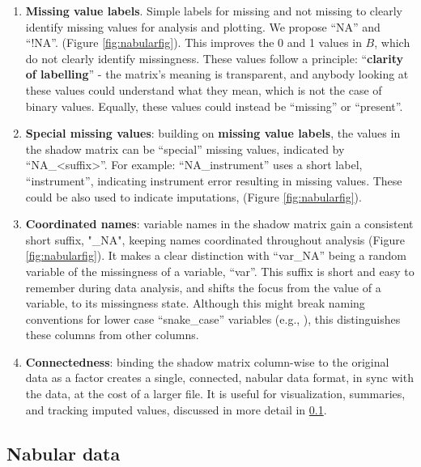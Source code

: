 \documentclass[
]{jss}
\begin{document}
\begin{enumerate}
\def\labelenumi{\arabic{enumi}.}
\item
  \textbf{Missing value labels}. Simple labels for missing and not missing to clearly identify missing values for analysis and plotting. We propose ``NA'' and ``!NA''. (Figure \ref{fig:nabularfig}). This improves the 0 and 1 values in \(B\), which do not clearly identify missingness. These values follow a principle: ``\textbf{clarity of labelling}'' - the matrix's meaning is transparent, and anybody looking at these values could understand what they mean, which is not the case of binary values. Equally, these values could instead be ``missing'' or ``present''.
\item
  \textbf{Special missing values}: building on \textbf{missing value labels}, the values in the shadow matrix can be ``special'' missing values, indicated by ``NA\_\textless suffix\textgreater{}''. For example: ``NA\_instrument'' uses a short label, ``instrument'', indicating instrument error resulting in missing values. These could be also used to indicate imputations, (Figure \ref{fig:nabularfig}).
\item
  \textbf{Coordinated names}: variable names in the shadow matrix gain a consistent short suffix, "\_NA", keeping names coordinated throughout analysis (Figure \ref{fig:nabularfig}). It makes a clear distinction with ``var\_NA'' being a random variable of the missingness of a variable, ``var''. This suffix is short and easy to remember during data analysis, and shifts the focus from the value of a variable, to its missingness state. Although this might break naming conventions for lower case ``snake\_case'' variables (e.g., \citet{Wickham2014}), this distinguishes these columns from other columns.
\item
  \textbf{Connectedness}: binding the shadow matrix column-wise to the original data as a factor creates a single, connected, nabular data format, in sync with the data, at the cost of a larger file. It is useful for visualization, summaries, and tracking imputed values, discussed in more detail in \ref{nabular-data}.
\end{enumerate}

\hypertarget{nabular-data}{%
\subsection{Nabular data}\label{nabular-data}}
\end{document}
